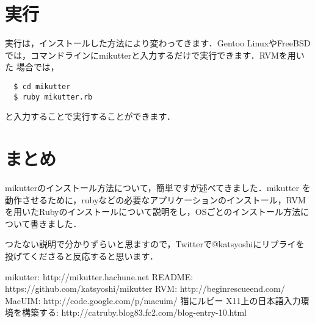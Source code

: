 \documentclass{jsarticle}
\begin{document}
 \section{実行} \label{execute}
 実行は，インストールした方法により変わってきます．Gentoo LinuxやFreeBSD
 では，コマンドラインにmikutterと入力するだけで実行できます．RVMを用いた
 場合では，
 \begin{lstlisting}
  $ cd mikutter
  $ ruby mikutter.rb
 \end{lstlisting}
 と入力することで実行することができます．
 \section{まとめ}
 mikutterのインストール方法について，簡単ですが述べてきました．mikutter
 を動作させるために，rubyなどの必要なアプリケーションのインストール，RVM
 を用いたRubyのインストールについて説明をし，OSごとのインストール方法に
 ついて書きました．
 
 つたない説明で分かりずらいと思ますので，Twitterで@katsyoshiにリプライを
 投げてくださると反応すると思います．

 \begin{thebibliography}{}
   mikutter: http://mikutter.hachune.net
   README: https://github.com/katsyoshi/mikutter
   RVM: http://beginrescueend.com/
   MacUIM: http://code.google.com/p/macuim/
   猫にルビー X11上の日本語入力環境を構築する: http://catruby.blog83.fc2.com/blog-entry-10.html
 \end{thebibliography}
\end{document}
